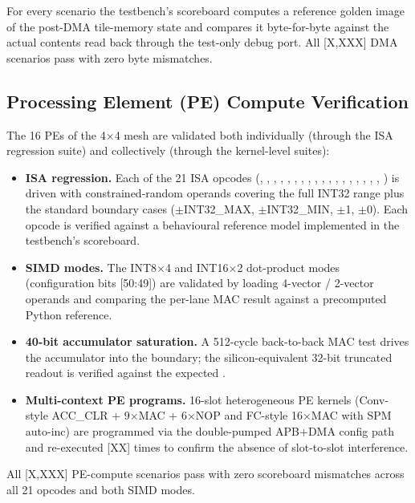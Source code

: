 For every scenario the testbench's scoreboard computes a reference
golden image of the post-DMA tile-memory state and compares it
byte-for-byte against the actual contents read back through the
test-only debug port. All [X{,}XXX] DMA scenarios pass with zero
byte mismatches.

\subsection{Processing Element (PE) Compute Verification}
\label{ssec:pe-tests}

The 16 PEs of the 4$\times$4 mesh are validated both individually
(through the ISA regression suite) and collectively (through the
kernel-level suites):

\begin{itemize}[leftmargin=1.4cm,itemsep=2pt,topsep=2pt]
\item \textbf{ISA regression.} Each of the 21 ISA opcodes
(, , , , ,
, , , , ,
, , , ,
, , , , ) is
driven with constrained-random operands covering the full INT32
range plus the standard boundary cases ($\pm$INT32\_MAX,
$\pm$INT32\_MIN, $\pm$1, $\pm$0). Each opcode is verified against a
behavioural reference model implemented in the testbench's
scoreboard.
\item \textbf{SIMD modes.} The INT8$\times$4 and INT16$\times$2
dot-product modes (configuration bits [50:49]) are validated by
loading 4-vector / 2-vector operands and comparing the per-lane MAC
result against a precomputed Python reference.
\item \textbf{40-bit accumulator saturation.} A 512-cycle
back-to-back MAC test drives the accumulator into the
 boundary; the silicon-equivalent
32-bit truncated readout is verified against the expected
.
\item \textbf{Multi-context PE programs.} 16-slot heterogeneous
PE kernels (Conv-style ACC\_CLR + 9$\times$MAC + 6$\times$NOP and
FC-style 16$\times$MAC with SPM auto-inc) are programmed via the
double-pumped APB+DMA config path and re-executed [XX] times to
confirm the absence of slot-to-slot interference.
\end{itemize}

All [X{,}XXX] PE-compute scenarios pass with zero scoreboard
mismatches across all 21 opcodes and both SIMD modes.

